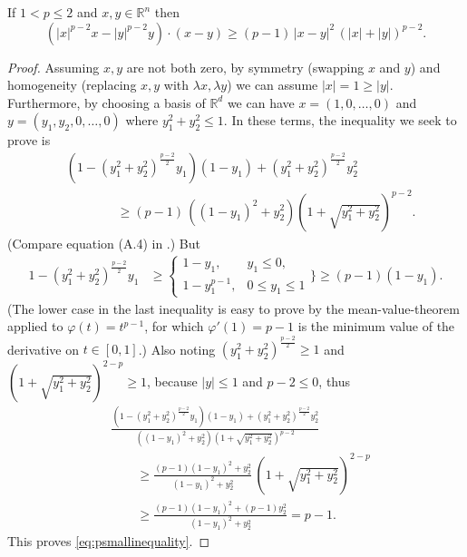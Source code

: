 \documentclass[final,onefignum]{siamart190516}
\newcommand\RR{\mathbb{R}}
\begin{document}
\begin{lemma}  \label{lem:psmallinequality}  If $1<p\le 2$ and $x,y\in\RR^n$ then
\begin{equation}
\left(|x|^{p-2} x - |y|^{p-2} y\right)\cdot(x-y) \ge (p-1)\, |x-y|^2 \, \left(|x|+|y|\right)^{p-2}. \label{eq:psmallinequality}
\end{equation}
\end{lemma}

\begin{proof}  Assuming $x,y$ are not both zero, by symmetry (swapping $x$ and $y$) and homogeneity (replacing $x,y$ with $\lambda x,\lambda y$) we can assume $|x| = 1 \ge |y|$.  Furthermore, by choosing a basis of $\RR^d$ we can have $x=(1,0,\dots,0)$ and $y=(y_1,y_2,0,\dots,0)$ where $y_1^2+y_2^2 \le 1$.  In these terms, the inequality we seek to prove is
\begin{align*}
&\left(1 - (y_1^2+y_2^2)^{\frac{p-2}{2}} y_1\right) (1-y_1) + (y_1^2+y_2^2)^{\frac{p-2}{2}} y_2^2 \\
&\qquad\qquad \ge (p-1)\, \left((1-y_1)^2+y_2^2\right) \left(1 + \sqrt{y_1^2+y_2^2} \right)^{p-2}.
\end{align*}
(Compare equation (A.4) in \cite{Peral1997}.)  But
\begin{align*}
1 - (y_1^2+y_2^2)^{\frac{p-2}{2}} y_1
      &\ge \begin{cases} 1-y_1, & y_1 \le 0, \\
                        1-y_1^{p-1}, & 0 \le y_1 \le 1 \end{cases}\Bigg\}
      \ge (p-1) (1-y_1).
\end{align*}
(The lower case in the last inequality is easy to prove by the mean-value-theorem applied to $\varphi(t)=t^{p-1}$, for which $\varphi'(1)=p-1$ is the minimum value of the derivative on $t\in[0,1]$.)  Also noting $(y_1^2+y_2^2)^{\frac{p-2}{2}} \ge 1$ and $\left(1 + \sqrt{y_1^2+y_2^2} \right)^{2-p} \ge 1$, because $|y|\le 1$ and $p-2\le 0$, thus
\begin{align*}
&\frac{\left(1 - (y_1^2+y_2^2)^{\frac{p-2}{2}} y_1\right) (1-y_1) + (y_1^2+y_2^2)^{\frac{p-2}{2}} y_2^2}
      {\left((1-y_1)^2+y_2^2\right) \left(1 + \sqrt{y_1^2+y_2^2} \right)^{p-2}} \\
&\qquad \ge \frac{(p-1) (1-y_1)^2 + y_2^2}
      {(1-y_1)^2+y_2^2} \,  \left(1 + \sqrt{y_1^2+y_2^2} \right)^{2-p} \\
&\qquad \ge \frac{(p-1) (1-y_1)^2 + (p-1) y_2^2}{(1-y_1)^2+y_2^2} = p-1.
\end{align*}
This proves \eqref{eq:psmallinequality}. \end{proof}
\end{document}
